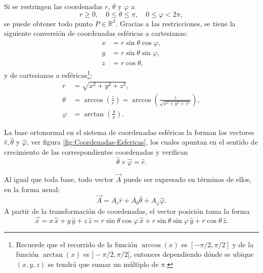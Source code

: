 Si se restringen las coordenadas $r$, $\theta$ y $\varphi$ a
\begin{equation}
r \geq 0, \quad 0 \leq \theta \leq \pi, \quad 0 \leq \varphi < 2\pi,
\end{equation}
se puede obtener todo punto $P \in \mathbb{R}^3$. Gracias a las restricciones, se tiene la siguiente conversión de coordenadas esféricas a cartesianas:
\begin{align}
    x &= r \sin \theta \cos \varphi,\\
    y &= r \sin \theta \sin \varphi ,\\
    z &= r \cos \theta,
\end{align}
y de cartesianas a esféricas\footnote{Recuerde que el recorrido de la función $\arccos(x)$ es $[-\pi/2, \pi/2]$ y de la función $\arctan(x)$ es $]-\pi/2, \pi/2[$, entonces dependiendo dónde se ubique $(x,y,z)$ se tendrá que sumar un múltiplo de $\pi$.}: 
\begin{align}
    r &= \sqrt{x^2+y^2+z^2}, \\
    \theta &= \arccos \left(\frac{z}{r} \right) = \arccos \left( \frac{z}{\sqrt{x^2+y^2+z^2}} \right), \\
    \varphi &= \arctan \left( \frac{y}{x} \right).
\end{align}

La base ortonormal en el sistema de coordenadas esféricas la forman los vectores $\hat{r}, \hat{\theta}$ y $\hat{\varphi}$, ver figura \ref{fig:Coordenadas-Esfericas}, los cuales apuntan en el sentido de crecimiento de las correspondientes coordenadas y verifican
\begin{equation}
\hat{\theta} \times \hat{\varphi} = \hat{r}.
\end{equation}

Al igual que toda base, todo vector $\Vec{A}$ puede ser expresado en términos de ellos, en la forma usual:
\begin{equation}
\Vec{A} = A_r \hat{r} + A_{\theta} \hat{\theta} + A_{\varphi} \hat{\varphi}.
\end{equation}
A partir de la transformación de coordenadas, el vector posición toma la forma
\begin{equation}
\Vec{x} = x \,\hat{x} + y \,\hat{y} + z \,\hat{z} = r \sin \theta \cos \varphi \,\hat{x} + r \sin \theta \sin \varphi \,\hat{y} + r \cos\theta \,\hat{z}.
\end{equation}

